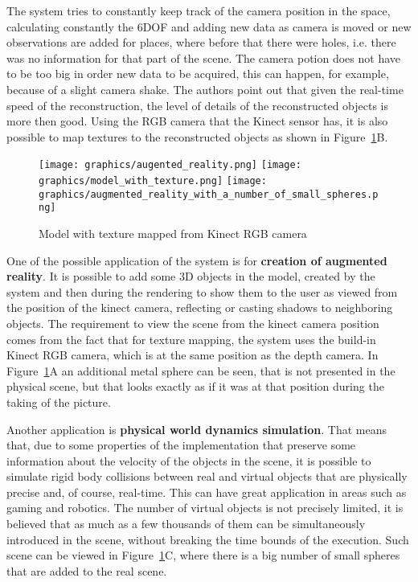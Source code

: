 \documentclass[12pt]{article}
\theoremstyle{plain}
\begin{document}
  The system tries to constantly keep track of the camera position in the space,
  calculating constantly the 6DOF and adding new data as camera is moved or new
  observations are added for places, where before that there were holes, i.e.
  there was no information for that part of the scene. The camera potion does
  not have to be too big in order new data to be acquired, this can happen, for
  example, because of a slight camera shake. The authors point out that given
  the real-time speed of the reconstruction, the level of details of the
  reconstructed objects is more then good. Using the RGB camera that the Kinect
  sensor has, it is also possible to map textures to the reconstructed objects
  as shown in Figure~\ref{fig:model_with_texture}B.

  \begin{figure}[h]
    \centering
    \caption{Model with texture mapped from Kinect RGB camera}
    \texttt{[image: graphics/augented\_reality.png]}
    \texttt{[image: graphics/model\_with\_texture.png]}
    \texttt{[image: graphics/augmented\_reality\_with\_a\_number\_of\_small\_spheres.png]}
    \label{fig:model_with_texture}
  \end{figure}

  One of the possible application of the system is for \textbf{creation of
  augmented reality}. It is possible to add some 3D objects in the model,
  created by the system and then during the rendering to show them to the user
  as viewed from the position of the kinect camera, reflecting or casting
  shadows to neighboring objects. The requirement to view the scene from the
  kinect camera position comes from the fact that for texture mapping, the
  system uses the build-in Kinect RGB camera, which is at the same position as
  the depth camera.  In Figure~\ref{fig:model_with_texture}A an additional metal
  sphere can be seen, that is not presented in the physical scene, but that
  looks exactly as if it was at that position during the taking of the picture.

  Another application is \textbf{physical world dynamics simulation}. That means
  that, due to some properties of the implementation that preserve some
  information about the velocity of the objects in the scene, it is possible to
  simulate rigid body collisions between real and virtual objects that are
  physically precise and, of course, real-time. This can have great application
  in areas such as gaming and robotics. The number of virtual objects is not
  precisely limited, it is believed that as much as a few thousands of them can
  be simultaneously introduced in the scene, without breaking the time bounds of
  the execution. Such scene can be viewed in
  Figure~\ref{fig:model_with_texture}C, where there is a big number of small
  spheres that are added to the real scene.
\end{document}

